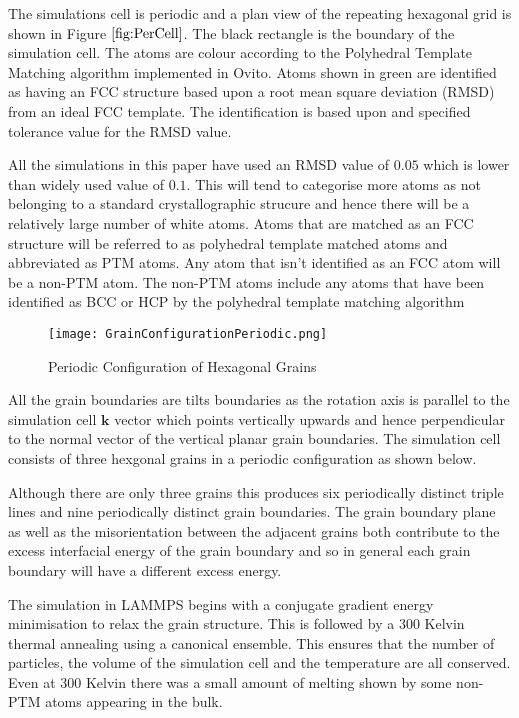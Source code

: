 \documentclass[12pt,a4paper]{book}
\begin{document}
The simulations cell is periodic and a plan view of the repeating hexagonal grid is shown in Figure $\ref{fig:PerCell}$. The black rectangle is the boundary of the simulation cell. The atoms are colour according to the Polyhedral Template Matching algorithm implemented in Ovito. Atoms shown in green are identified as having an FCC structure based upon a root mean square deviation (RMSD) from an ideal FCC template. The identification is based upon and specified tolerance value for the RMSD value. 

All the simulations in this paper have used an RMSD value of $0.05$ which is lower than widely used value of $0.1$. This will tend to categorise more atoms as not belonging to a standard crystallographic strucure and hence there will be a relatively large number of white atoms. Atoms that are matched as an FCC structure will be referred to as polyhedral template matched atoms and abbreviated as PTM atoms. Any atom that isn't identified as an FCC atom will be a non-PTM atom. The non-PTM atoms include any atoms that have been identified as BCC or HCP by the polyhedral template matching algorithm 
 
\begin{figure}[H] \label{fig:PerCell}
	\texttt{[image: GrainConfigurationPeriodic.png]} 
	\label{fig:GrainCP}
	\caption{Periodic Configuration of Hexagonal Grains}
\end{figure}

All the grain boundaries are tilts boundaries as the rotation axis is parallel to the simulation cell $\mathbf{k}$ vector which points vertically upwards and hence perpendicular to the normal vector of the vertical planar grain boundaries. The simulation cell consists of three hexgonal grains in a periodic configuration as shown below.

Although there are only three grains this produces six periodically distinct triple lines and nine periodically distinct grain boundaries. The grain boundary plane as well as the misorientation between the adjacent grains both contribute to the excess interfacial energy of the grain boundary and so in general each grain boundary will have a different excess energy.

The simulation in LAMMPS begins with a conjugate gradient energy minimisation to relax the grain structure. This is followed by a $300$ Kelvin thermal annealing using a canonical ensemble. This ensures that the number of particles, the volume of the simulation cell and the temperature are all conserved.  Even at $300$ Kelvin there was a small amount of melting shown by some non-PTM atoms appearing in the bulk. 
\end{document}
